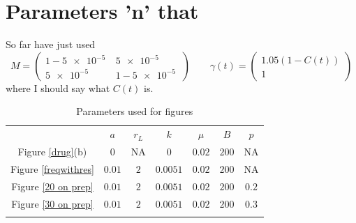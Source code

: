 \documentclass[DIV=15]{scrartcl}
\begin{document}

\section*{Parameters 'n' that}
So far have just used 
\begin{equation*}
M =  \begin{pmatrix} 1-\SI{5e-5}{} & \SI{5e-5}{} \\ \SI{5e-5}{} & 1- \SI{5e-5}{} \end{pmatrix} \qquad \gamma(t) = \begin{pmatrix} 1.05(1- C(t)) \\1 \end{pmatrix}
\end{equation*}
where I should say what $C(t)$ is.

\begin{table}
\caption{Parameters used for figures}
\label{tab:1}       %
\begin{tabular}{c|c|c|c|c|c|c}
\hline\noalign{\smallskip}
{} & $a$ & $r_L$ & $k$ & $\mu$ & $B$ & $p$\\
\noalign{\smallskip}\hline\noalign{\smallskip}
Figure \ref{drug}(b) & $0$ & NA & $0$ & $0.02$ & $200$ & NA\\
Figure \ref{freqwithres} & $0.01$ & $2$ & $0.0051$ & $0.02$ & $200$ & NA \\
Figure \ref{20 on prep} & $0.01$ & $2$ & $0.0051$ & $0.02$ & $200$ & $0.2$ \\
Figure \ref{30 on prep} & $0.01$ & $2$ & $0.0051$ & $0.02$ & $200$ & $0.3$ \\
\noalign{\smallskip}\hline
\end{tabular}
\end{table}







 
\end{document}

